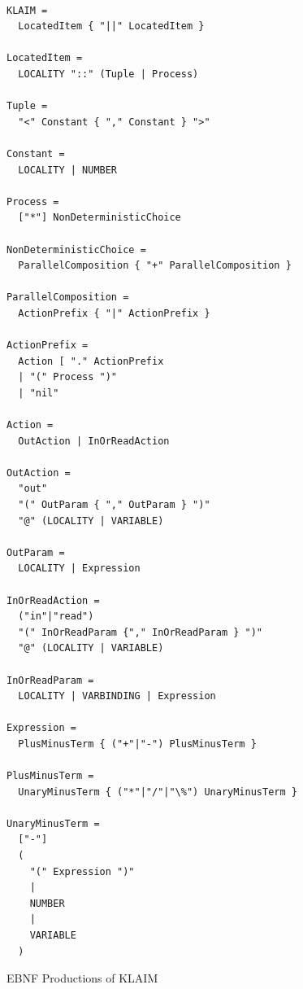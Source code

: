 	\begin{figure}
	\label{fig:klaim_ebnf}
	\caption{EBNF Productions of KLAIM}
\lstset{showtabs=false,showspaces=false,showstringspaces=false}
\begin{lstlisting}[frame=trbl,label=lst:klaim_ebnf,basicstyle=\scriptsize\ttfamily,showtabs=false,showspaces=false]

KLAIM = 
  LocatedItem { "||" LocatedItem }                

LocatedItem = 
  LOCALITY "::" (Tuple | Process)

Tuple = 
  "<" Constant { "," Constant } ">"

Constant = 
  LOCALITY | NUMBER

Process = 
  ["*"] NonDeterministicChoice

NonDeterministicChoice =  
  ParallelComposition { "+" ParallelComposition }

ParallelComposition = 
  ActionPrefix { "|" ActionPrefix }

ActionPrefix = 
  Action [ "." ActionPrefix
  | "(" Process ")"  
  | "nil"

Action = 
  OutAction | InOrReadAction

OutAction = 
  "out" 
  "(" OutParam { "," OutParam } ")" 
  "@" (LOCALITY | VARIABLE)

OutParam = 
  LOCALITY | Expression

InOrReadAction = 
  ("in"|"read") 
  "(" InOrReadParam {"," InOrReadParam } ")" 
  "@" (LOCALITY | VARIABLE)

InOrReadParam = 
  LOCALITY | VARBINDING | Expression

Expression = 
  PlusMinusTerm { ("+"|"-") PlusMinusTerm }

PlusMinusTerm = 
  UnaryMinusTerm { ("*"|"/"|"\%") UnaryMinusTerm }

UnaryMinusTerm = 
  ["-"] 
  ( 
    "(" Expression ")" 
    | 
    NUMBER 
    | 
    VARIABLE 
  )

	\end{lstlisting}
	\end{figure}


